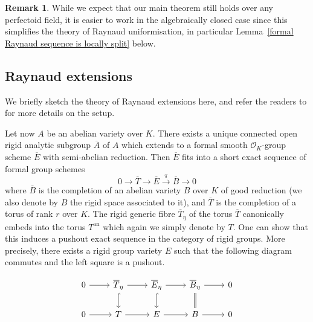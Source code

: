 \documentclass[10pt,oneside]{amsart}
\theoremstyle{definition}
\newtheorem{remark}[theorem]{Remark}
\begin{document}
	
	\begin{remark}
	While we expect that our main theorem still holds over any perfectoid field, it is easier to work in the algebraically closed case since this simplifies the theory of Raynaud uniformisation, in particular Lemma~\ref{formal Raynaud sequence is locally split} below.
	\end{remark}
	
	
	\subsection{Raynaud extensions}
	
        We briefly sketch the theory of Raynaud extensions here, and refer the readers to  \cite{rigid geometry of curves} for more details on the setup.

	Let now $A$ be an abelian variety over $K$. There exists a unique connected open rigid analytic subgroup $\overline A$ of $A$ which extends to a formal smooth $\mathcal O_K$-group scheme $\overline E$ with semi-abelian reduction. Then $\overline E$ fits into a short exact sequence of formal group schemes
	\begin{equation}\label{formal Raynaud extension}
	0\rightarrow \overline T \rightarrow \overline E \xrightarrow{\pi} \overline{B}\rightarrow 0
	\end{equation}
	where $\overline{B}$ is the completion of an abelian variety $B$ over $K$ of good reduction (we also denote by $B$ the rigid space associated to it), and $\overline{T}$ is the completion of a torus of rank $r$ over $K$.
	The rigid generic fibre $\overline{T}_\eta$ of the torus $\overline{T}$ canonically embeds into the torus $T^{\operatorname{an}}$ which again we simply denote by $T$. One can show that this induces a pushout exact sequence in the category of rigid groups. More precisely, there exists a rigid group variety $E$ such that the following diagram commutes and the left square is a pushout.
	\begin{center}
		\begin{equation}
		\begin{tikzcd}
			0 \arrow[r] & \overline{T}_\eta \arrow[d, hook] \arrow[r] & \overline{E}_\eta \arrow[d, hook] \arrow[r] & \overline{B}_\eta \arrow[d,equal] \arrow[r] & 0 \\
			0 \arrow[r] & T \arrow[r] & E \arrow[r] & B \arrow[r] & 0
		\end{tikzcd}
		\end{equation}
	\end{center}
	
\end{document}
